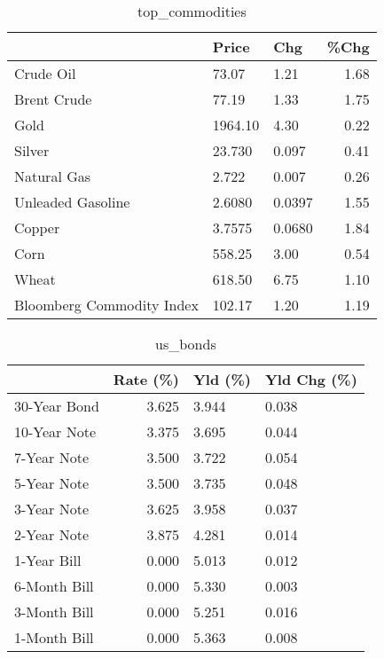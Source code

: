 \documentclass{article}%
\begin{document}
\begin{table}[htbp]%
\caption{top\_commodities}%
\centering%
\begin{adjustbox}{width=1\textwidth}%
\begin{tabular}{lllr}
\toprule
                          &   Price &    Chg &  \%Chg \\
\midrule
               Crude Oil  &   73.07 &   1.21 &  1.68 \\
             Brent Crude  &   77.19 &   1.33 &  1.75 \\
                    Gold  & 1964.10 &   4.30 &  0.22 \\
                  Silver  &  23.730 &  0.097 &  0.41 \\
             Natural Gas  &   2.722 &  0.007 &  0.26 \\
       Unleaded Gasoline  &  2.6080 & 0.0397 &  1.55 \\
                  Copper  &  3.7575 & 0.0680 &  1.84 \\
                    Corn  &  558.25 &   3.00 &  0.54 \\
                   Wheat  &  618.50 &   6.75 &  1.10 \\
Bloomberg Commodity Index &  102.17 &   1.20 &  1.19 \\
\bottomrule
\end{tabular}
%
\end{adjustbox}%
\end{table}

%


\begin{table}[htbp]%
\caption{us\_bonds}%
\centering%
\begin{adjustbox}{width=1\textwidth}%
\begin{tabular}{lrll}
\toprule
             &  Rate (\%) & Yld (\%) & Yld Chg (\%) \\
\midrule
30-Year Bond &     3.625 &   3.944 &       0.038 \\
10-Year Note &     3.375 &   3.695 &       0.044 \\
 7-Year Note &     3.500 &   3.722 &       0.054 \\
 5-Year Note &     3.500 &   3.735 &       0.048 \\
 3-Year Note &     3.625 &   3.958 &       0.037 \\
 2-Year Note &     3.875 &   4.281 &       0.014 \\
 1-Year Bill &     0.000 &   5.013 &       0.012 \\
6-Month Bill &     0.000 &   5.330 &       0.003 \\
3-Month Bill &     0.000 &   5.251 &       0.016 \\
1-Month Bill &     0.000 &   5.363 &       0.008 \\
\bottomrule
\end{tabular}
%
\end{adjustbox}%
\end{table}
\end{document}
